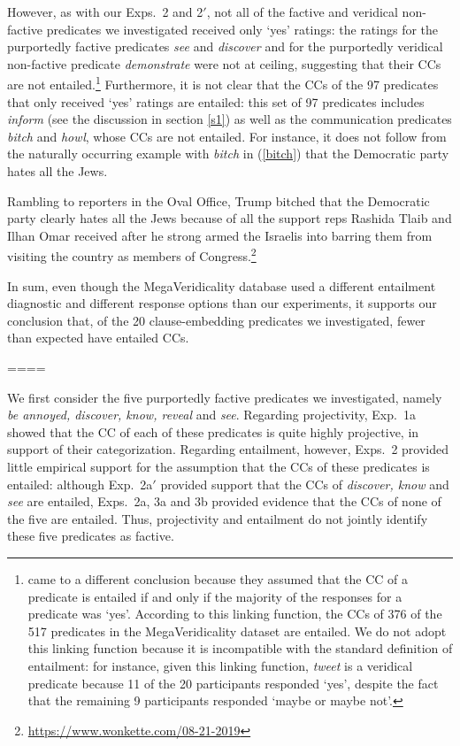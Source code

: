 \documentclass[11pt,fleqn]{article}
\newcommand{\6}{\mbox{$[\hspace*{-.6mm}[$}}
\newcommand{\9}{\mbox{$]\hspace*{-.6mm}]$}}
\begin{document}
{However, as with our Exps.~2 and 2$'$, not all of the factive and veridical non-factive predicates we investigated received only `yes' ratings: the ratings for the purportedly factive predicates {\em see} and {\em discover} and for the purportedly veridical non-factive predicate {\em demonstrate} were not at ceiling, suggesting that their CCs are not entailed.\footnote{\label{mv}\citet{white-rawlins-nels2018} came to a different conclusion because they assumed that the CC of a predicate is entailed if and only if the majority of the responses for a predicate was `yes'. According to this linking function, the CCs of 376 of the 517 predicates in the MegaVeridicality dataset are entailed. We do not adopt this linking function because it is incompatible with the standard definition of entailment: for instance, given this linking function, {\em tweet} is a veridical predicate because 11 of the 20 participants responded `yes', despite the fact that the remaining 9 participants responded `maybe or maybe not'.} Furthermore, it is not clear that the CCs of the 97  predicates that only received `yes' ratings are entailed: this set of 97 predicates includes {\em inform} (see the discussion in section \ref{s1}) as well as the communication predicates {\em bitch} and {\em howl}, whose CCs are not entailed. For instance, it does not follow from the naturally occurring example with {\em bitch} in (\ref{bitch}) that the Democratic party hates all the Jews.

\begin{exe}
\ex\label{bitch} Rambling to reporters in the Oval Office, Trump bitched that the Democratic party clearly hates all the Jews because of all the support reps Rashida Tlaib and Ilhan Omar received after he strong armed the Israelis into barring them from visiting the country as members of Congress.\footnote{\url{https://www.wonkette.com/08-21-2019}}
\end{exe}
In sum, even though the MegaVeridicality database used a different entailment diagnostic and different response options than our experiments, it supports our conclusion that, of the 20 clause-embedding predicates we investigated, fewer than expected have entailed CCs. 
 
 ====

We first consider the five purportedly factive predicates we investigated, namely {\em be annoyed, discover, know, reveal} and {\em see}. Regarding projectivity, Exp.~1a showed that the CC of each of these predicates is quite highly projective, in support of their categorization. Regarding entailment, however, Exps.~2 provided little empirical support for the assumption that the CCs of these predicates is entailed: although Exp.~2a$'$ provided support that the CCs of {\em discover, know} and {\em see} are entailed, Exps.~2a, 3a and 3b provided evidence that the CCs of none of the five are entailed. Thus, projectivity and entailment do not jointly identify these five predicates as factive.

}
\end{document}
